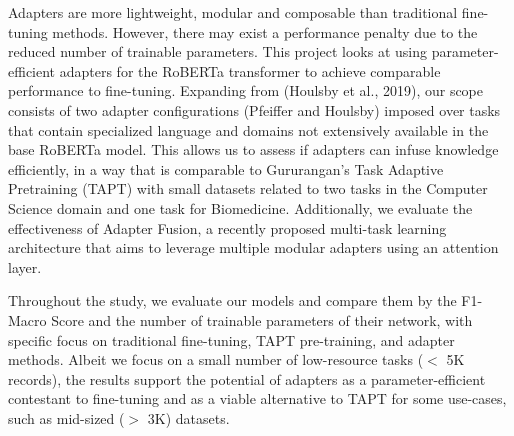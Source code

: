 \documentclass[draft,10pt,twocolumn,letterpaper]{article}
\begin{document}
Adapters are more lightweight, modular and composable than traditional fine-tuning methods. However, there may exist a performance penalty due to the reduced number of trainable parameters. This project looks at using parameter-efficient adapters for the RoBERTa transformer to achieve comparable performance to fine-tuning. Expanding from (Houlsby et al., 2019), our scope consists of two adapter configurations (Pfeiffer and Houlsby) imposed over tasks that contain specialized language and domains not extensively available in the base RoBERTa model. This allows us to assess if adapters can infuse knowledge efficiently, in a way that is comparable to Gururangan’s Task Adaptive Pretraining (TAPT) with small datasets related to two tasks in the Computer Science domain and one task for Biomedicine. Additionally, we evaluate the effectiveness of Adapter Fusion, a recently proposed multi-task learning architecture that aims to leverage multiple modular adapters using an attention layer. 

Throughout the study, we evaluate our models and compare them by the F1-Macro Score and the number of trainable parameters of their network, with specific focus on traditional fine-tuning, TAPT pre-training, and adapter methods. Albeit we focus on a small number of low-resource tasks ($<$ 5K records), the results support the potential of adapters as a parameter-efficient contestant to fine-tuning and as a viable alternative to TAPT for some use-cases, such as mid-sized ($>$ 3K) datasets.
\end{document}
